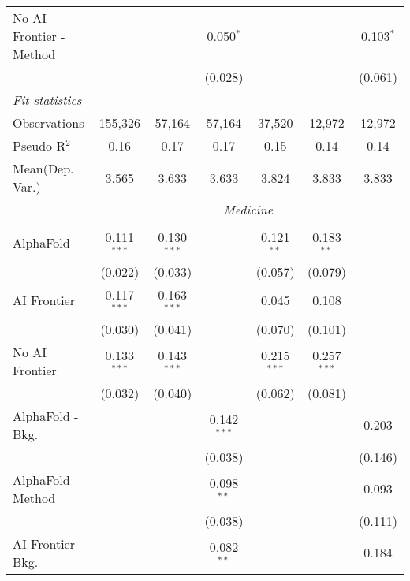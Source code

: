 \begin{tabular}{lcccccc}
   No AI Frontier - Method &               &               & 0.050$^{*}$  &               &              & 0.103$^{*}$\\   
                           &               &               & (0.028)      &               &              & (0.061)\\   
   \midrule
   \emph{Fit statistics}\\
   Observations            & 155,326       & 57,164        & 57,164       & 37,520        & 12,972       & 12,972\\  
   Pseudo R$^2$            & 0.16          & 0.17          & 0.17         & 0.15          & 0.14         & 0.14\\  
   
Mean(Dep. Var.) & 3.565 & 3.633 & 3.633 & 3.824 & 3.833 & 3.833 \\
 & \multicolumn{6}{c}{\textit{Medicine}} \\ \\
   AlphaFold               & 0.111$^{***}$ & 0.130$^{***}$ &               & 0.121$^{**}$  & 0.183$^{**}$  &   \\   
                           & (0.022)       & (0.033)       &               & (0.057)       & (0.079)       &   \\   
   AI Frontier             & 0.117$^{***}$ & 0.163$^{***}$ &               & 0.045         & 0.108         &   \\   
                           & (0.030)       & (0.041)       &               & (0.070)       & (0.101)       &   \\   
   No AI Frontier          & 0.133$^{***}$ & 0.143$^{***}$ &               & 0.215$^{***}$ & 0.257$^{***}$ &   \\   
                           & (0.032)       & (0.040)       &               & (0.062)       & (0.081)       &   \\   
   AlphaFold - Bkg.        &               &               & 0.142$^{***}$ &               &               & 0.203\\   
                           &               &               & (0.038)       &               &               & (0.146)\\   
   AlphaFold - Method      &               &               & 0.098$^{**}$  &               &               & 0.093\\   
                           &               &               & (0.038)       &               &               & (0.111)\\   
   AI Frontier - Bkg.      &               &               & 0.082$^{**}$  &               &               & 0.184\\   

\end{tabular}
